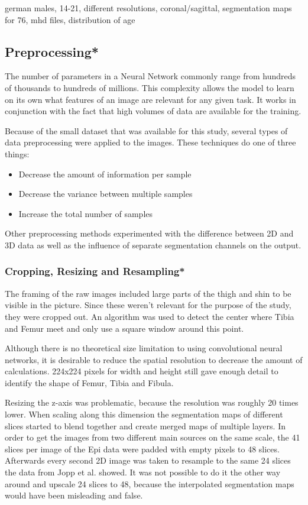 german males, 14-21, different resolutions, coronal/sagittal, segmentation maps for 76, mhd files, distribution of age



\subsection{Preprocessing*}

The number of parameters in a Neural Network commonly range from hundreds of thousands to hundreds of millions. This complexity allows the model to learn on its own what features of an image are relevant for any given task. It works in conjunction with the fact that high volumes of data are available for the training.

Because of the small dataset that was available for this study, several types of data preprocessing were applied to the images. These techniques do one of three things:

\begin{itemize}
\item Decrease the amount of information per sample
\item Decrease the variance between multiple samples
\item Increase the total number of samples
\end{itemize}

Other preprocessing methods experimented with the difference between 2D and 3D data as well as the influence of separate segmentation channels on the output.

\subsubsection{Cropping, Resizing and Resampling*}

The framing of the raw images included large parts of the thigh and shin to be visible in the picture. Since these weren't relevant for the purpose of the study, they were cropped out. An algorithm was used to detect the center where Tibia and Femur meet and only use a square window around this point.

Although there is no theoretical size limitation to using convolutional neural networks, it is desirable to reduce the spatial resolution to decrease the amount of calculations. 224x224 pixels for width and height still gave enough detail to identify the shape of Femur, Tibia and Fibula.

Resizing the z-axis was problematic, because the resolution was roughly 20 times lower. When scaling along this dimension the segmentation maps of different slices started to blend together and create merged maps of multiple layers. In order to get the images from two different main sources on the same scale, the 41 slices per image of the Epi data were padded with empty pixels to 48 slices. Afterwards every second 2D image was taken to resample to the same 24 slices the data from Jopp et al. showed. It was not possible to do it the other way around and upscale 24 slices to 48, because the interpolated segmentation maps would have been misleading and false.

